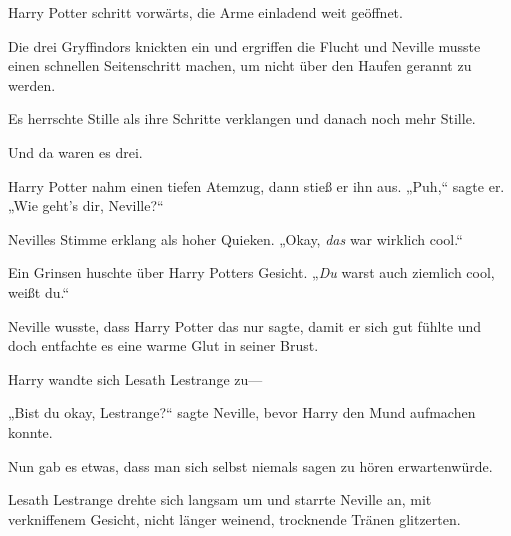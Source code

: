 Harry Potter schritt vorwärts, die Arme einladend weit geöffnet.

Die drei Gryffindors knickten ein und ergriffen die Flucht und Neville musste einen schnellen Seitenschritt machen, um nicht über den Haufen gerannt zu werden.

Es herrschte Stille als ihre Schritte verklangen und danach noch mehr Stille.

Und da waren es drei.

Harry Potter nahm einen tiefen Atemzug, dann stieß er ihn aus. „Puh,“ sagte er. „Wie geht's dir, Neville?“

Nevilles Stimme erklang als hoher Quieken. „Okay, \emph{das} war wirklich cool.“

Ein Grinsen huschte über Harry Potters Gesicht. „\emph{Du} warst auch ziemlich cool, weißt du.“

Neville wusste, dass Harry Potter das nur sagte, damit er sich gut fühlte und doch entfachte es eine warme Glut in seiner Brust.

Harry wandte sich Lesath Lestrange zu—

„Bist du okay, Lestrange?“ sagte Neville, bevor Harry den Mund aufmachen konnte.

Nun gab es etwas, dass man sich selbst niemals sagen zu hören erwartenwürde.

Lesath Lestrange drehte sich langsam um und starrte Neville an, mit verkniffenem Gesicht, nicht länger weinend, trocknende Tränen glitzerten.

